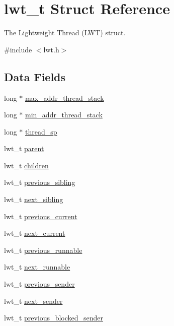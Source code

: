 \hypertarget{structlwt}{\section{lwt\+\_\+t Struct Reference}
\label{structlwt}
}


The Lightweight Thread (L\+W\+T) struct.  




{\ttfamily \#include $<$lwt.\+h$>$}

\subsection*{Data Fields}
\begin{DoxyCompactItemize}
\item 
long $\ast$ \hyperlink{structlwt_ae97cdce617ee026378588f57a999f972}{max\+\_\+addr\+\_\+thread\+\_\+stack}
\item 
long $\ast$ \hyperlink{structlwt_a62ea9a882e0a197b9b076e1e018048d7}{min\+\_\+addr\+\_\+thread\+\_\+stack}
\item 
long $\ast$ \hyperlink{structlwt_aba48cdf2f962d7ededf74923ddd33ea1}{thread\+\_\+sp}
\item 
lwt\+\_\+t \hyperlink{structlwt_a1849cde569fc8f254db05365de570b0e}{parent}
\item 
lwt\+\_\+t \hyperlink{structlwt_a33d2fa8a95fe7c0deb7c7723bd4af344}{children}
\item 
lwt\+\_\+t \hyperlink{structlwt_a28f05f6ebc974d92415a55b8e190670e}{previous\+\_\+sibling}
\item 
lwt\+\_\+t \hyperlink{structlwt_a5557ab4e2bdd3634b38f5035461767d6}{next\+\_\+sibling}
\item 
lwt\+\_\+t \hyperlink{structlwt_afe18cb4e9b5f4c60289674d2298993a2}{previous\+\_\+current}
\item 
lwt\+\_\+t \hyperlink{structlwt_a96a9b5218a20b704188442a3056601ae}{next\+\_\+current}
\item 
lwt\+\_\+t \hyperlink{structlwt_acb89e009a8cb87cbd5d71ab5ca08911b}{previous\+\_\+runnable}
\item 
lwt\+\_\+t \hyperlink{structlwt_a1636aae4155df6a60c90c7ab737687e4}{next\+\_\+runnable}
\item 
lwt\+\_\+t \hyperlink{structlwt_ae9ef76c08e20117f01976c5c7cfb28b9}{previous\+\_\+sender}
\item 
lwt\+\_\+t \hyperlink{structlwt_a77161e9127f308ba8540546c705cc3d9}{next\+\_\+sender}
\item 
lwt\+\_\+t \hyperlink{structlwt_a2060a9eb6fe521e93c509e10e2778907}{previous\+\_\+blocked\+\_\+sender}

\end{DoxyCompactItemize}
